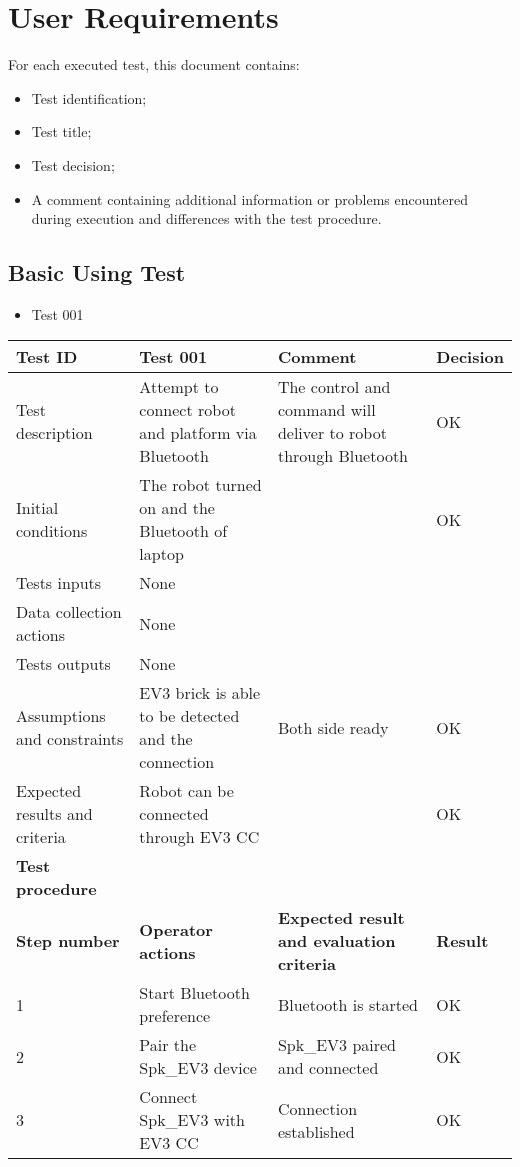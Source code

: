 \documentclass[11pt, a4paper]{article}
\begin{document}
\section{User Requirements}
For each executed test, this document contains:\\
\begin{itemize}
\item {Test identification;}\\
\item {Test title;}\\
\item {Test decision;}\\
\item {A comment containing additional information or problems encountered during execution and differences with the test procedure.}\\
\end{itemize}
\newpage

\subsection{Basic Using Test}
\begin{itemize}
\item {Test 001}\\
\end{itemize}

\begin{tabular} 
	 {|p{4cm}|p{4.5cm}|p{4.5cm}|p{1.5cm}|}
\hline
\textbf{Test ID} & \textbf{Test 001} & \textbf{Comment} & \textbf{Decision}\\
\hline
{Test description} & {Attempt to connect robot and platform via Bluetooth} & {The control and command will deliver to robot through \newline Bluetooth} & {OK}\\
\hline
{Initial conditions} & {The robot turned on and the Bluetooth of laptop } & {} & {OK}\\
\hline
{Tests inputs} & {None} & {} & {}\\
\hline
{Data collection actions} & {None} & {} & {}\\
\hline
{Tests outputs} & {None} & {} & {}\\
\hline
{Assumptions and constraints} & {EV3 brick is able to be detected and the connection} & {Both side ready} & {OK}\\
\hline
{Expected results and criteria} & {Robot can be connected through EV3 CC} & {} & {OK}\\
\hline
\textbf{Test procedure} & \textbf{} & \textbf{} & \textbf{}\\
\hline
\textbf{Step number} & \textbf{Operator actions} & \textbf{Expected result and \newline evaluation criteria} & \textbf{Result}\\
\hline
{1} & {Start Bluetooth preference} & {Bluetooth is started} & {OK}\\
\hline
{2} & {Pair the Spk\_EV3 device} & {Spk\_EV3 paired and connected} & {OK}\\
\hline
{3} & {Connect Spk\_EV3 with EV3 CC} & {Connection established} & {OK}\\
\hline
\end{tabular}
\newpage
\end{document}
